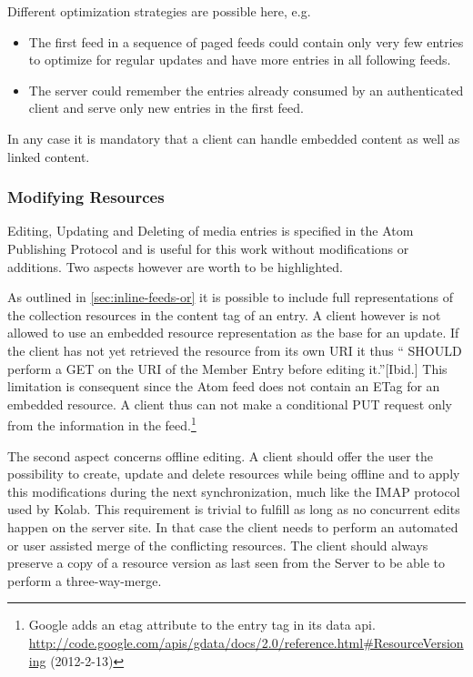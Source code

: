 \documentclass[12pt,a4paper]{scrartcl}		%
\newcommand{\citeurl}[2]{\url{#1} (#2)}
\begin{document}
Different optimization strategies are possible here, e.g.

\begin{itemize}
\item The first feed in a sequence of paged feeds could contain only very few
  entries to optimize for regular updates and have more entries in all following
  feeds.
\item The server could remember the entries already consumed by an authenticated
  client and serve only new entries in the first feed.
\end{itemize}

In any case it is mandatory that a client can handle embedded content as well as
linked content.

\subsubsection{Modifying Resources}

Editing, Updating and Deleting of media entries is specified in the Atom
Publishing Protocol and is useful for this work without modifications or
additions. Two aspects however are worth to be highlighted.

As outlined in \autoref{sec:inline-feeds-or} it is possible to include full
representations of the collection resources in the content tag of an entry. A
client however is not allowed to use an embedded resource representation as the
base for an update.\cite[sec. 10]{RFC5023} If the client has not yet retrieved
the resource from its own URI it thus `` SHOULD perform a GET on the URI of the
Member Entry before editing it.''[Ibid.] This limitation is consequent since the
Atom feed does not contain an ETag for an embedded resource. A client thus can
not make a conditional PUT request only from the information in the
feed.\footnote{Google adds an etag attribute to the entry tag in its data
  api. \citeurl{http://code.google.com/apis/gdata/docs/2.0/reference.html\#ResourceVersioning}{2012-2-13}}

The second aspect concerns offline editing. A client should offer the user the
possibility to create, update and delete resources while being offline and to
apply this modifications during the next synchronization, much like the IMAP
protocol used by Kolab. This requirement is trivial to fulfill as long as no
concurrent edits happen on the server site. In that case the client needs to
perform an automated or user assisted merge of the conflicting resources. The
client should always preserve a copy of a resource version as last seen from the
Server to be able to perform a three-way-merge.
\end{document}
